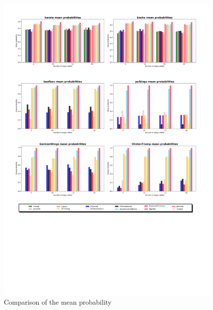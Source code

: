\begin{figure}[!htbp]
	\begin{center}
	\advance\leftskip-1.5cm
	\captionsetup{justification=centering,margin=2cm}
	\includegraphics[width=1.2\textwidth]{Figures/mean6}
	\caption{Comparison of the mean probability}
	\label{mean}
	\end{center}
\end{figure}

\clearpage
 
